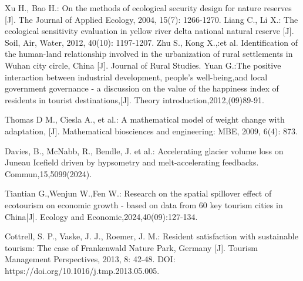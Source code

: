 \documentclass[UTF8]{mcmthesis}
\begin{document}
    \begin{thebibliography}{99}

        Xu H., Bao H.: On the methods of ecological security design for nature reserves [J]. The Journal of Applied Ecology, 2004, 15(7): 1266-1270.
         Liang C., Li X.: The ecological sensitivity evaluation in yellow river delta national natural reserve [J]. Soil, Air, Water, 2012, 40(10): 1197-1207.
        Zhu S., Kong X.,:et al. Identification of the human-land relationship involved in the urbanization of rural settlements in Wuhan city circle, China [J]. Journal of Rural Studies.
        Yuan G.:The positive interaction between industrial development, people's well-being,and local government governance - a discussion on the value of the happiness index of residents in tourist destinations,[J]. Theory introduction,2012,(09)89-91.
        
        Thomas D M., Ciesla A., et al.: A mathematical model of weight change with adaptation, [J]. Mathematical biosciences and engineering: MBE, 2009, 6(4): 873.
        
        Davies, B., McNabb, R., Bendle, J. et al.: Accelerating glacier volume loss on Juneau Icefield driven by hypsometry and melt-accelerating feedbacks. Commun,15,5099(2024). 
        
        Tiantian G.,Wenjun W.,Fen W.:
        Research on the spatial spillover effect of ecotourism on economic growth - based on data from 60 key tourism cities in China[J]. Ecology and Economic,2024,40(09):127-134.
        
        Cottrell, S. P., Vaske, J. J., Roemer, J. M.:
        Resident satisfaction with sustainable tourism: The case of Frankenwald Nature Park, Germany [J].
        Tourism Management Perspectives, 2013, 8: 42-48. 
        DOI: https://doi.org/10.1016/j.tmp.2013.05.005.
        
    
    \end{thebibliography}
\end{document}
